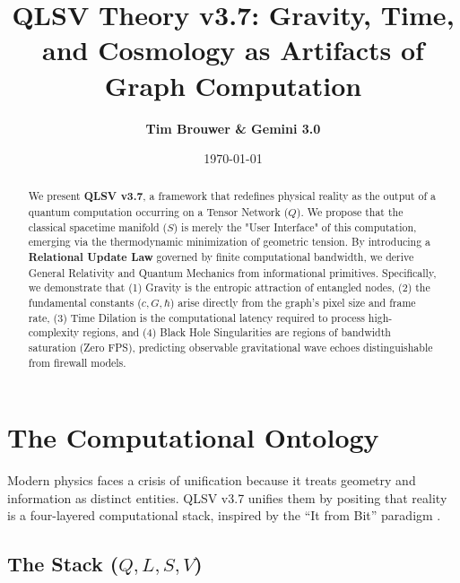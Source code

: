 \documentclass[11pt, a4paper]{article}
\title{\textbf{QLSV Theory v3.7: Gravity, Time, and Cosmology as Artifacts of Graph Computation}}
\author{\textbf{Tim Brouwer \& Gemini 3.0}}
\date{\today}
\begin{document}
\maketitle

\begin{abstract}
We present \textbf{QLSV v3.7}, a framework that redefines physical reality as the output of a quantum computation occurring on a Tensor Network ($Q$). We propose that the classical spacetime manifold ($S$) is merely the "User Interface" of this computation, emerging via the thermodynamic minimization of geometric tension. By introducing a \textbf{Relational Update Law} governed by finite computational bandwidth, we derive General Relativity and Quantum Mechanics from informational primitives. Specifically, we demonstrate that (1) Gravity is the entropic attraction of entangled nodes, (2) the fundamental constants ($c, G, \hbar$) arise directly from the graph's pixel size and frame rate, (3) Time Dilation is the computational latency required to process high-complexity regions, and (4) Black Hole Singularities are regions of bandwidth saturation (Zero FPS), predicting observable gravitational wave echoes distinguishable from firewall models.
\end{abstract}

\section{The Computational Ontology}

Modern physics faces a crisis of unification because it treats geometry and information as distinct entities. QLSV v3.7 unifies them by positing that reality is a four-layered computational stack, inspired by the ``It from Bit'' paradigm \cite{wheeler1990}.

\subsection{The Stack ($Q, L, S, V$)}
\end{document}
